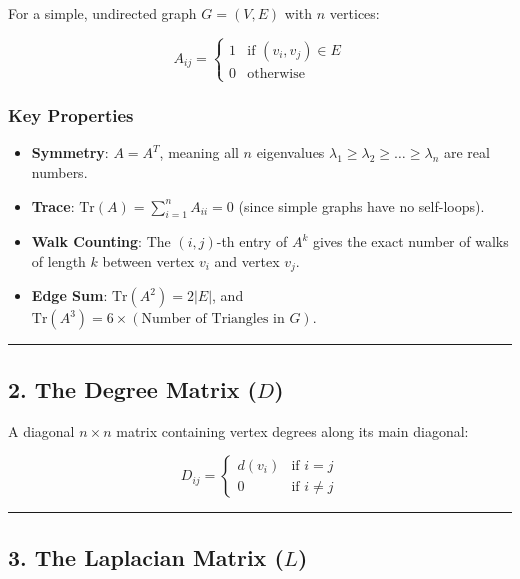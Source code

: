 \documentclass[
]{book}
\providecommand{\tightlist}{%
  \setlength{\itemsep}{0pt}\setlength{\parskip}{0pt}}
\theoremstyle{definition}
\theoremstyle{definition}
\theoremstyle{definition}
\theoremstyle{definition}
\theoremstyle{remark}
\begin{document}
For a simple, undirected graph \(G = (V, E)\) with \(n\) vertices:

\[A_{ij} = \begin{cases} 1 & \text{if } (v_i, v_j) \in E \\ 0 & \text{otherwise} \end{cases}\]

\subsubsection{Key Properties}\label{key-properties-1}

\begin{itemize}
\tightlist
\item
  \textbf{Symmetry}: \(A = A^T\), meaning all \(n\) eigenvalues \(\lambda_1 \ge \lambda_2 \ge \dots \ge \lambda_n\) are real numbers.
\item
  \textbf{Trace}: \(\text{Tr}(A) = \sum_{i=1}^n A_{ii} = 0\) (since simple graphs have no self-loops).
\item
  \textbf{Walk Counting}: The \((i, j)\)-th entry of \(A^k\) gives the exact number of walks of length \(k\) between vertex \(v_i\) and vertex \(v_j\).
\item
  \textbf{Edge Sum}: \(\text{Tr}(A^2) = 2\vert{}E\vert{}\), and \(\text{Tr}(A^3) = 6 \times (\text{Number of Triangles in } G)\).
\end{itemize}

\begin{center}\rule{0.5\linewidth}{0.5pt}\end{center}

\subsection{\texorpdfstring{2. The Degree Matrix (\(D\))}{2. The Degree Matrix (D)}}\label{the-degree-matrix-d}

A diagonal \(n \times n\) matrix containing vertex degrees along its main diagonal:

\[D_{ij} = \begin{cases} d(v_i) & \text{if } i = j \\ 0 & \text{if } i \neq j \end{cases}\]

\begin{center}\rule{0.5\linewidth}{0.5pt}\end{center}

\subsection{\texorpdfstring{3. The Laplacian Matrix (\(L\))}{3. The Laplacian Matrix (L)}}\label{the-laplacian-matrix-l}
\end{document}
